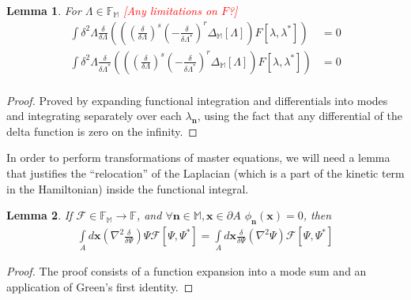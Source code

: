 \documentclass[12pt,aip,jmp,amssymb,amsmath]{revtex4-1}
\newcommand{\todo}[1]{\textcolor{red}{[#1]}}
\newcommand{\nvec}{\boldsymbol{n}}
\newcommand{\xvec}{\boldsymbol{x}}
\newcommand{\restbasis}{\mathbb{M}}
\newtheorem{lemma}{Lemma}
\begin{document}
\begin{lemma}
\label{lmm:func-calculus:zero-delta-integrals}
    For $\Lambda \in \mathbb{F}_{\restbasis}$ \todo{Any limitations on $F$?}
    \begin{equation*}\begin{split}
        \int \delta^2\Lambda
            \frac{\delta}{\delta \Lambda} \left(
                \left(
                    \left( \frac{\delta}{\delta \Lambda} \right)^s
                    \left( -\frac{\delta}{\delta \Lambda^*} \right)^r
                    \Delta_{\restbasis}[\Lambda]
                \right)
                F[\lambda, \lambda^*]
            \right)
        & = 0 \\
        \int \delta^2\Lambda
            \frac{\delta}{\delta \Lambda^*} \left(
                \left(
                    \left( \frac{\delta}{\delta \Lambda} \right)^s
                    \left( -\frac{\delta}{\delta \Lambda^*} \right)^r
                    \Delta_{\restbasis}[\Lambda]
                \right)
                F[\lambda, \lambda^*]
            \right)
        & = 0 \\
    \end{split}\end{equation*}
\end{lemma}
\begin{proof}
Proved by expanding functional integration and differentials into modes and integrating separately over each $\lambda_{\nvec}$, using the fact that any differential of the delta function is zero on the infinity.
\end{proof}

In order to perform transformations of master equations, we will need a lemma that justifies the ``relocation'' of the Laplacian (which is a part of the kinetic term in the Hamiltonian) inside the functional integral.

\begin{lemma}
\label{lmm:func-calculus:move-laplacian}
    If $\mathcal{F} \in \mathbb{F}_{\restbasis} \rightarrow \mathbb{F}$, and $\forall \nvec \in \restbasis, \xvec \in \partial A$ $\phi_{\nvec}(\xvec) = 0$, then
    \begin{equation*}\begin{split}
        \int\limits_A d\xvec \left(
            \nabla^2 \frac{\delta}{\delta \Psi}
        \right) \Psi \mathcal{F}[\Psi, \Psi^*]
        = \int\limits_A d\xvec \frac{\delta}{\delta \Psi}
        ( \nabla^2 \Psi ) \mathcal{F}[\Psi, \Psi^*]
    \end{split}\end{equation*}
\end{lemma}
\begin{proof}
The proof consists of a function expansion into a mode sum and an application of Green's first identity.
\end{proof}
\end{document}
